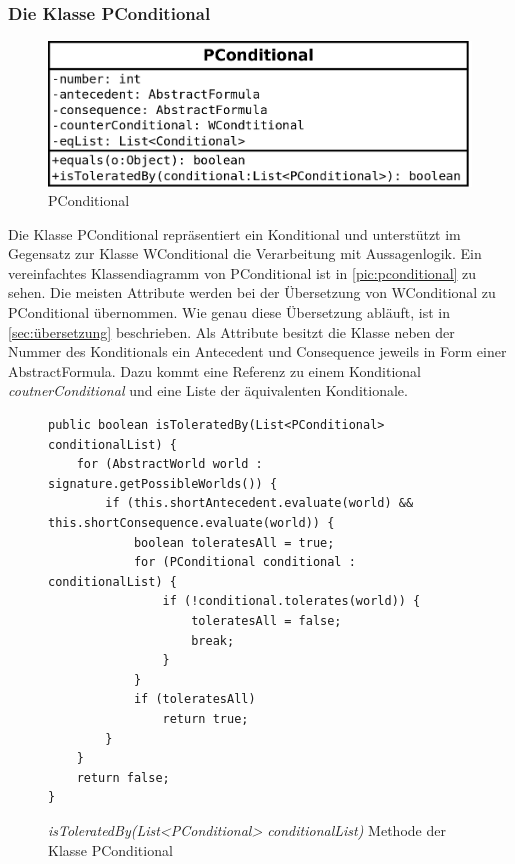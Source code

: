 \documentclass[12pt,a4paper]{article}
\begin{document}
\subsubsection{Die Klasse PConditional}
\label{sec:pconditional}
\begin{figure}
\includegraphics[width=0.55\linewidth]{bilder/PConditional.png}
\caption{PConditional}
\label{pic:pconditional}
\end{figure}


Die Klasse PConditional repräsentiert ein Konditional und unterstützt im Gegensatz zur Klasse WConditional die Verarbeitung mit Aussagenlogik. Ein vereinfachtes Klassendiagramm von PConditional ist in \autoref{pic:pconditional} zu sehen. Die meisten Attribute werden bei der Übersetzung von WConditional zu PConditional übernommen. Wie genau diese Übersetzung abläuft, ist in \autoref{sec:übersetzung} beschrieben. Als Attribute besitzt die Klasse neben der Nummer des Konditionals ein Antecedent und Consequence jeweils in Form einer AbstractFormula. Dazu kommt eine Referenz zu einem Konditional \textit{coutnerConditional} und eine Liste der äquivalenten Konditionale.


\begin{figure}
\begin{lstlisting}
public boolean isToleratedBy(List<PConditional> conditionalList) {
    for (AbstractWorld world : signature.getPossibleWorlds()) {
        if (this.shortAntecedent.evaluate(world) && this.shortConsequence.evaluate(world)) {
            boolean toleratesAll = true;
            for (PConditional conditional : conditionalList) {
                if (!conditional.tolerates(world)) {
                    toleratesAll = false;
                    break;
                }
            }
            if (toleratesAll)
                return true;
        }
    }
    return false;
}
\end{lstlisting}
\caption{\textit{isToleratedBy(List<PConditional> conditionalList)} Methode der Klasse PConditional}
\label{code:conditional-istoleratedby}
\end{figure}
\end{document}
